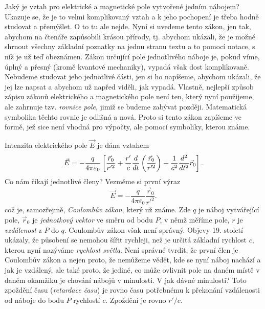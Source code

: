 {    Jaký je vztah pro elektrické a magnetické pole vytvořené jedním nábojem? Ukazuje se, že je to 
    velmi komplikovaný vztah a k jeho pochopení je třeba hodně studovat a přemýšlet. O to tu ale 
    nejde. Nyní si uvedeme tento zákon, jen tak, abychom na čtenáře zapůsobili krásou přírody, tj. 
    abychom ukázali, že je možné shrnout všechny základní poznatky na jednu stranu textu a to 
    pomocí notace, s níž je už teď obeznámen. Zákon určující pole jednotlivého náboje je, pokud 
    víme, úplný a přesný (kromě kvantové mechaniky), vypadá však dost komplikovaně. Nebudeme 
    studovat jeho jednotlivé části, jen si ho napíšeme, abychom ukázali, že jej lze napsat a 
    abychom už napřed viděli, jak vypadá. Vlastně, nejlepší způsob zápisu zákonů elektrického a 
    magnetického pole není ten, který nyní použijeme, ale zahrnuje tzv. \emph{rovnice pole}, jimiž 
    se budeme zabývat později. Matematická symbolika těchto rovnic je odlišná a nová. Proto si 
    tento zákon zapíšeme ve formě, jež sice není vhodná pro výpočty, ale pomocí symboliky, kterou 
    známe. 
    
    Intenzita elektrického pole \(\vec{E}\) je dána vztahem
    \begin{equation}\label{fyz:eq298}
      \vec{E} = -\frac{q}{4\pi\varepsilon_0}\left[
                 \frac{\vec{r}_0}{r'^2} + 
                 \frac{r'}{c}\frac{d  }{d t}\left(\frac{\vec{r}_0}{r'^2}\right) +
                 \frac{1}{c^2}\frac{d^2  }{d t^2}\vec{r}_0
                 \right].
    \end{equation}
    Co nám říkají jednotlivé členy? Vezměme si první výraz
    \begin{equation*}
      \vec{E} = -\frac{q}{4\pi\varepsilon_0}\frac{\vec{r}_0}{r'^2}. 
    \end{equation*}
    což je, samozřejmě, \emph{Coulombův zákon}, který už známe. Zde \(q\) je náboj vytvářející 
    pole, \(\vec{r}_0\) je \emph{jednotkový vektor} ve směru od bodu \(P\), v němž měříme pole, 
    \(r\) je \emph{vzdálenost} z \(P\) do \(q\). Coulombův zákon však není správný. Objevy 19. 
    století ukázaly, že působení se nemohou šířit rychleji, než je určitá základní rychlost \(c\), 
    kterou nyní nazýváme \emph{rychlost světla}. Není správné tvrdit, že první člen je Coulombův 
    zákon a nejen proto, že nemůžeme vědět, kde se nyní náboj nachází a jak je vzdálený, ale také 
    proto, že jediné, co může ovlivnit pole na daném místě v daném okamžiku je chování nábojů v 
    minulosti. V jak dávné minulosti? Toto zpoždění času (\emph{retardace času}) je rovno času 
    potřebnému k překonání vzdálenosti od náboje do bodu \(P\) rychlostí \(c\). Zpoždění je rovno 
    \(r'/c\). 
    
}
